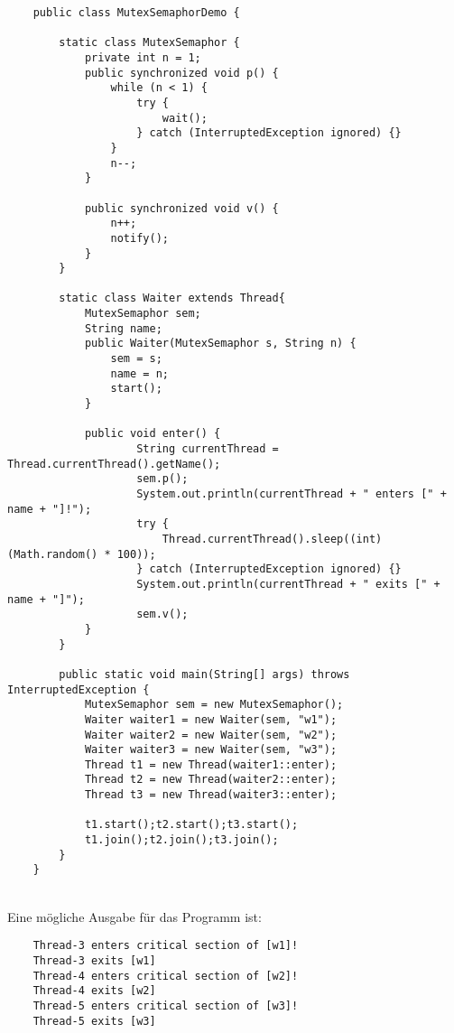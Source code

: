 \newpage
\begin{verbatim}
    public class MutexSemaphorDemo {

        static class MutexSemaphor {
            private int n = 1;
            public synchronized void p() {
                while (n < 1) {
                    try {
                        wait();
                    } catch (InterruptedException ignored) {}
                }
                n--;
            }

            public synchronized void v() {
                n++;
                notify();
            }
        }

        static class Waiter extends Thread{
            MutexSemaphor sem;
            String name;
            public Waiter(MutexSemaphor s, String n) {
                sem = s;
                name = n;
                start();
            }

            public void enter() {
                    String currentThread = Thread.currentThread().getName();
                    sem.p();
                    System.out.println(currentThread + " enters [" + name + "]!");
                    try {
                        Thread.currentThread().sleep((int) (Math.random() * 100));
                    } catch (InterruptedException ignored) {}
                    System.out.println(currentThread + " exits [" + name + "]");
                    sem.v();
            }
        }

        public static void main(String[] args) throws InterruptedException {
            MutexSemaphor sem = new MutexSemaphor();
            Waiter waiter1 = new Waiter(sem, "w1");
            Waiter waiter2 = new Waiter(sem, "w2");
            Waiter waiter3 = new Waiter(sem, "w3");
            Thread t1 = new Thread(waiter1::enter);
            Thread t2 = new Thread(waiter2::enter);
            Thread t3 = new Thread(waiter3::enter);

            t1.start();t2.start();t3.start();
            t1.join();t2.join();t3.join();
        }
    }
\end{verbatim}\\

\newpage
Eine mögliche Ausgabe für das Programm ist:\\

\noindent
\begin{verbatim}
    Thread-3 enters critical section of [w1]!
    Thread-3 exits [w1]
    Thread-4 enters critical section of [w2]!
    Thread-4 exits [w2]
    Thread-5 enters critical section of [w3]!
    Thread-5 exits [w3]
\end{verbatim}\\

